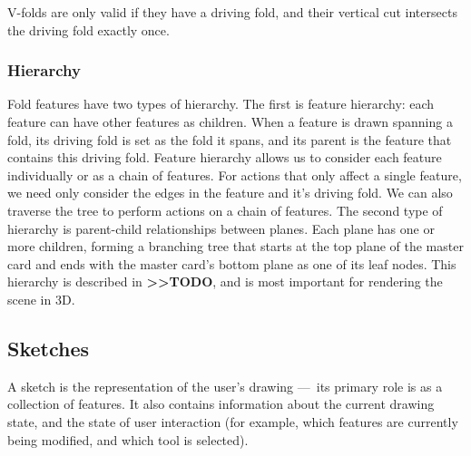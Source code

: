 V-folds are only valid if they have a driving fold, and their vertical
cut intersects the driving fold exactly once.

\subsubsection{Hierarchy}\label{hierarchy}

Fold features have two types of hierarchy. The first is feature
hierarchy: each feature can have other features as children. When a
feature is drawn spanning a fold, its driving fold is set as the fold it
spans, and its parent is the feature that contains this driving fold.
Feature hierarchy allows us to consider each feature individually or as
a chain of features. For actions that only affect a single feature, we
need only consider the edges in the feature and it's driving fold. We
can also traverse the tree to perform actions on a chain of features.
The second type of hierarchy is parent-child relationships between
planes. Each plane has one or more children, forming a branching tree
that starts at the top plane of the master card and ends with the master
card's bottom plane as one of its leaf nodes. This hierarchy is
described in \textbf{\textgreater{}\textgreater{}TODO}, and is most
important for rendering the scene in 3D.

\subsection{Sketches}\label{sketches}

A sketch is the representation of the user's drawing ---~its primary
role is as a collection of features. It also contains information about
the current drawing state, and the state of user interaction (for
example, which features are currently being modified, and which tool is
selected).

